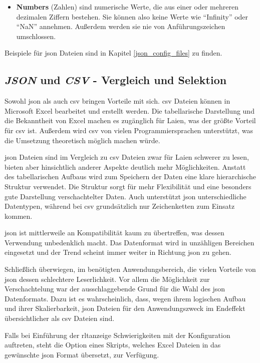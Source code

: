 \begin{itemize}
	\item \textbf{Numbers} (\dt Zahlen) sind numerische Werte, die aus einer oder mehreren dezimalen Ziffern bestehen. Sie können also keine Werte wie \zB \enquote{Infinity} oder \enquote{NaN} annehmen. Außerdem werden sie nie von Anführungszeichen umschlossen. 
	
\end{itemize}

Beispiele für \ac{json} Dateien sind in Kapitel \ref{json_config_files} zu finden.

\subsection{\textit{JSON} und \textit{CSV} - Vergleich und Selektion} \label{json_vs_csv}
Sowohl \ac{json} als auch \ac{csv} bringen Vorteile mit sich. 
\ac{csv} Dateien können in Microsoft Excel bearbeitet und erstellt werden. Die tabellarische Darstellung und die Bekanntheit von Excel machen es zugänglich für Laien, was der größte Vorteil für \ac{csv} ist. Außerdem wird \ac{csv} von vielen Programmiersprachen unterstützt, was die Umsetzung theoretisch möglich machen würde. 

\ac{json} Dateien sind im Vergleich zu \ac{csv} Dateien zwar für Laien schwerer zu lesen, bieten aber hinsichtlich anderer Aspekte deutlich mehr Möglichkeiten. Anstatt des tabellarischen Aufbaus wird zum Speichern der Daten eine klare hierarchische Struktur verwendet. Die Struktur sorgt für mehr Flexibilität und eine besonders gute Darstellung verschachtelter Daten. Auch unterstützt \ac{json} unterschiedliche Datentypen, während bei \ac{csv} grundsätzlich nur Zeichenketten zum Einsatz kommen.

\ac{json} ist mittlerweile an Kompatibilität kaum zu übertreffen, was dessen Verwendung unbedenklich macht. Das Datenformat wird in unzähligen Bereichen eingesetzt und der Trend scheint immer weiter in Richtung \ac{json} zu gehen.

Schließlich überwiegen, im benötigten Anwendungsbereich, die vielen Vorteile von \ac{json} dessen schlechtere Leserlichkeit. Vor allem die Möglichkeit zur Verschachtelung war der ausschlaggebende Grund für die Wahl des \ac{json} Datenformats. Dazu ist es wahrscheinlich, dass, wegen ihrem logischen Aufbau und ihrer Skalierbarkeit, \ac{json} Dateien für den Anwendungszweck im Endeffekt übersichtlicher als \ac{csv} Dateien sind.

Falls bei Einführung der \ac{rltanzeige} Schwierigkeiten mit der Konfiguration auftreten, steht \zB die Option eines Skripts, welches Excel Dateien in das gewünschte \ac{json} Format übersetzt, zur Verfügung.

